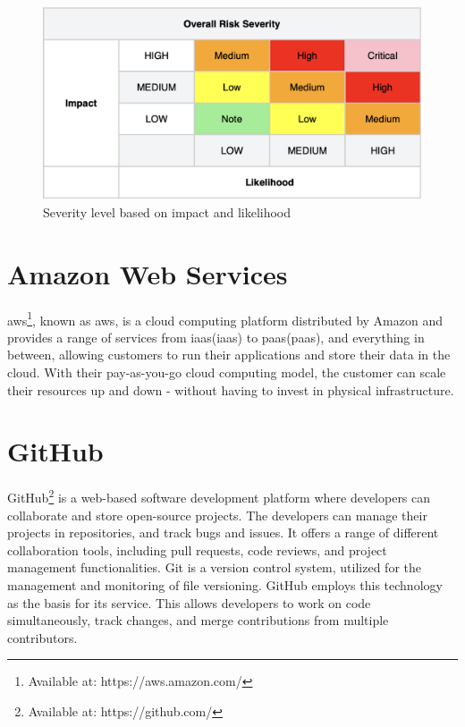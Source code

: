 \begin{figure}[H]
    \centering
    \includegraphics[scale=0.4]{Images/OWASP-severity.png}
    \caption{Severity level based on impact and likelihood}
    \label{fig: OWASP Severity Scale}
\end{figure}
\newpage




\section{Amazon Web Services}
\acrlong{aws}\footnote{Available at: https://aws.amazon.com/}, known as \acrshort{aws}, is a cloud computing platform distributed by Amazon and provides a range of services from \acrlong{iaas}(\acrshort{iaas}) to \acrlong{paas}(\acrshort{paas}), and everything in between, allowing customers to run their applications and store their data in the cloud. With their pay-as-you-go cloud computing model, the customer can scale their resources up and down - without having to invest in physical infrastructure.\cite{aws}  

\section{GitHub}
GitHub\footnote{Available at: https://github.com/} is a web-based software development platform where developers can collaborate and store open-source projects. The developers can manage their projects in repositories, and track bugs and issues. It offers a range of different collaboration tools, including pull requests, code reviews, and project management functionalities. Git is a version control system, utilized for the management and monitoring of file versioning. GitHub employs this technology as the basis for its service. This allows developers to work on code simultaneously, track changes, and merge contributions from multiple contributors.\cite{github}
